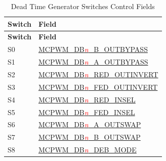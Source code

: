 \begin{longtable}[c]{ |p{4cm}|p{6cm}| }
    \caption{Dead Time Generator Switches Control Fields}
    \label{tab:mcpwm-s-dt}
    \\\hline
    \rowcolor{lightgray}
    \textbf{Switch}
    & \textbf{Field}
    \\\hline
    \endfirsthead
    \hline
    \rowcolor{lightgray}   
    \textbf{Switch}
    & \textbf{Field}
    \\\hline
    \endhead
    \hline
    \endfoot
    S0
    & \hyperref[fielddesc:MCPWMDBNBOUTBYPASS]{MCPWM\_DB\textcolor{red}{\it{n}}\_B\_OUTBYPASS}
    \\\hline
    S1
    & \hyperref[fielddesc:MCPWMDBNAOUTBYPASS]{MCPWM\_DB\textcolor{red}{\it{n}}\_A\_OUTBYPASS}
    \\\hline
    S2
    & \hyperref[fielddesc:MCPWMDBNREDOUTINVERT]{MCPWM\_DB\textcolor{red}{\it{n}}\_RED\_OUTINVERT}
    \\\hline
    S3
    & \hyperref[fielddesc:MCPWMDBNFEDOUTINVERT]{MCPWM\_DB\textcolor{red}{\it{n}}\_FED\_OUTINVERT}
    \\\hline
    S4
    & \hyperref[fielddesc:MCPWMDBNREDINSEL]{MCPWM\_DB\textcolor{red}{\it{n}}\_RED\_INSEL}
    \\\hline
    S5
    & \hyperref[fielddesc:MCPWMDBNFEDINSEL]{MCPWM\_DB\textcolor{red}{\it{n}}\_FED\_INSEL}
    \\\hline
    S6
    & \hyperref[fielddesc:MCPWMDBNAOUTSWAP]{MCPWM\_DB\textcolor{red}{\it{n}}\_A\_OUTSWAP}
    \\\hline
    S7
    & \hyperref[fielddesc:MCPWMDBNBOUTSWAP]{MCPWM\_DB\textcolor{red}{\it{n}}\_B\_OUTSWAP}
    \\\hline
    S8
    & \hyperref[fielddesc:MCPWMDBNDEBMODE]{MCPWM\_DB\textcolor{red}{\it{n}}\_DEB\_MODE}
    \\\hline
\end{longtable}